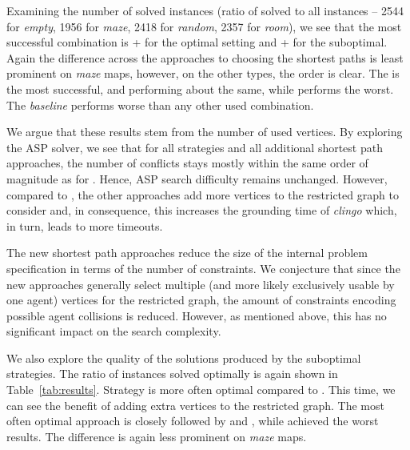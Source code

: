 Examining the number of solved instances (ratio of solved to all instances -- 2544 for \emph{empty}, 1956 for \emph{maze}, 2418 for \emph{random}, 2357 for \emph{room}), we see that the most successful combination is \ssp{} + \pss{} for the optimal setting and \ssc{} + \pss{} for the suboptimal. Again the difference across the approaches to choosing the shortest paths is least prominent on \emph{maze} maps, however, on the other types, the order is clear. The \pss{} is the most successful, \psd{} and \psr{} performing about the same, while \psa{} performs the worst. The \emph{baseline} \ssb{} performs worse than any other used combination.

We argue that these results stem from the number of used vertices. By exploring the ASP solver, we see that for all strategies and all additional shortest path approaches, the number of conflicts stays mostly within the same order of magnitude as for \pss{}. Hence, ASP search difficulty remains unchanged.
However, compared to \pss{}, the other approaches add more vertices to the restricted graph to consider and, in consequence, this increases the grounding time of \emph{clingo} which, in turn, leads to more timeouts.

The new shortest path approaches reduce the size of the internal problem specification in terms of the number of constraints.
We conjecture that since the new approaches generally select multiple (and more likely exclusively usable by one agent) vertices for the restricted graph, the amount of constraints encoding possible agent collisions is reduced. However, as mentioned above, this has no significant impact on the search complexity.

We also explore the quality of the solutions produced by the suboptimal strategies. The ratio of instances solved optimally is again shown in Table~\ref{tab:results}. Strategy \ssc{} is more often optimal compared to \ssm{}. This time, we can see the benefit of adding extra vertices to the restricted graph. The most often optimal approach is \psa{} closely followed by \psr{} and \psd{}, while \pss{} achieved the worst results. The difference is again less prominent on \emph{maze} maps.